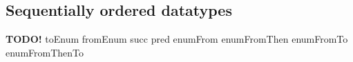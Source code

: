 %

\subsection{Sequentially ordered datatypes}

\textbf{TODO!}
toEnum fromEnum succ pred enumFrom enumFromThen enumFromTo enumFromThenTo

%